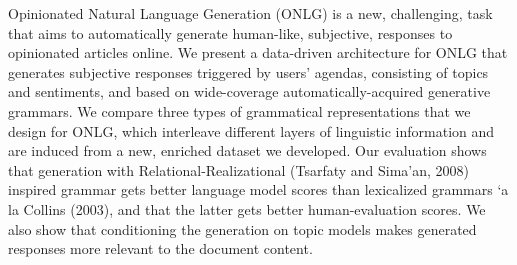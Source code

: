 Opinionated Natural Language Generation (ONLG) is a new, challenging, task that aims to automatically generate human-like, subjective, responses to opinionated articles online. We present a data-driven architecture for ONLG that generates subjective responses triggered by users' agendas, consisting of topics and sentiments, and based on wide-coverage automatically-acquired generative grammars. We compare three types of grammatical representations that we design for ONLG, which interleave different layers of linguistic information and are induced from a new, enriched dataset we developed. Our evaluation shows that generation with Relational-Realizational (Tsarfaty and Sima'an, 2008) inspired grammar gets better language model scores than lexicalized grammars `a la Collins (2003), and that the latter gets better human-evaluation scores. We also show that conditioning the generation on topic models makes generated responses more relevant to the document content.
